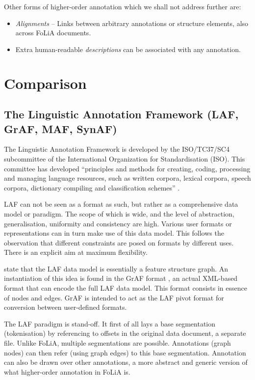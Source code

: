 \documentclass[a4paper,10pt,twoside]{article}
\begin{document}
Other forms of higher-order annotation which we shall not address further are:

\begin{itemize}
  \item \emph{Alignments} -- Links \cite{XLINK} between arbitrary annotations or structure
elements, also across FoLiA documents.  
  \item Extra human-readable \emph{descriptions} can be associated with any annotation.
\end{itemize}


\section{Comparison}
\label{sec:comparison}

\subsection{The Linguistic Annotation Framework (LAF, GrAF, MAF, SynAF)}
\label{sec:LAF}

The Linguistic Annotation Framework is developed by the ISO/TC37/SC4
subcommittee of the International Organization for Standardisation (ISO). This
committee has developed ``principles and methods for creating, coding,
processing and managing language resources, such as written corpora, lexical
corpora, speech corpora, dictionary compiling and classification schemes''
\cite{LAF}. 

LAF can not be seen as a format as such, but rather as a comprehensive data
model or paradigm. The scope of which is wide, and the level of abstraction,
generalisation, uniformity and consistency are high. Various user formats or
representations can in turn make use of this data model. This follows the
observation that different constraints are posed on formats by different uses.
There is an explicit aim at maximum flexibility. 

 state that the LAF data model is essentially a feature structure
graph. An instantiation of this idea is found in the GrAF format \cite{GRAF},
an actual XML-based format that can encode the full LAF data model. This format
 consists in essence of nodes and edges. GrAF is intended to act as the LAF pivot format
for conversion between user-defined formats. 

The LAF paradigm is stand-off. It first of all lays a base segmentation
(tokenisation) by referencing to offsets in the original data document, a
separate file. Unlike FoLiA, multiple segmentations are possible. Annotations
(graph nodes) can then refer (using graph edges) to this base segmentation.
Annotation can also be drawn over other annotations, a more abstract and
generic version of what higher-order annotation in FoLiA is.
\end{document}
